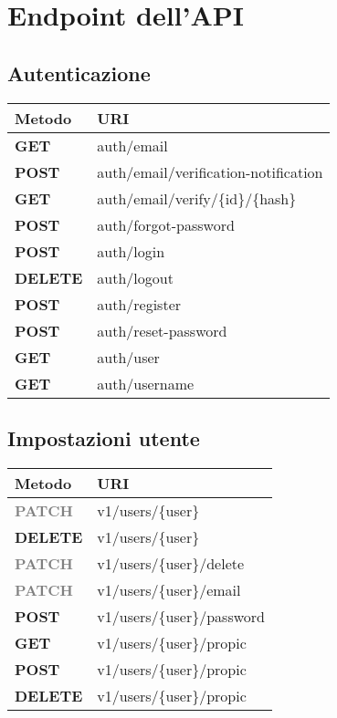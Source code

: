 \chapter{Endpoint dell'API}\label{cap:endpoint_api}
\section{Autenticazione}
\begin{table}[h]
	\begin{tabularx}{\textwidth}{l X}
		\hline
		\textbf{Metodo} & \textbf{URI} \\
		\hline
		\textcolor{get}{\textbf{GET}}    &     auth/email  \\
		\textcolor{post}{\textbf{POST}} &           auth/email/verification-notification  \\
		\textcolor{get}{\textbf{GET}}     &   auth/email/verify/\{id\}/\{hash\}   \\
		\textcolor{post}{\textbf{POST}}     &       auth/forgot-password   \\
		\textcolor{post}{\textbf{POST}}      &      auth/login  \\
		\textcolor{delete}{\textbf{DELETE}} &          auth/logout \\
		\textcolor{post}{\textbf{POST}}    &        auth/register  \\
		\textcolor{post}{\textbf{POST}}   &         auth/reset-password   \\
		\textcolor{get}{\textbf{GET}}      &   auth/user   \\
		\textcolor{get}{\textbf{GET}}     &    auth/username  \\
		\hline
	\end{tabularx}
\end{table}

\section{Impostazioni utente}
\begin{table}[h]
	\begin{tabularx}{\textwidth}{l X}
		\hline
		\textbf{Metodo} & \textbf{URI} \\
		\hline
		\textcolor{gray}{\textbf{PATCH}}    &        v1/users/\{user\}\\
		\textcolor{delete}{\textbf{DELETE}}  &        v1/users/\{user\}\\
		\textcolor{gray}{\textbf{PATCH}}     &      v1/users/\{user\}/delete\\
		\textcolor{gray}{\textbf{PATCH}}    &      v1/users/\{user\}/email\\
		\textcolor{post}{\textbf{POST}}    &       v1/users/\{user\}/password\\
		\textcolor{get}{\textbf{GET}} &       v1/users/\{user\}/propic\\
		\textcolor{post}{\textbf{POST}}      &     v1/users/\{user\}/propic\\
		\textcolor{delete}{\textbf{DELETE}}    &     v1/users/\{user\}/propic\\
		\hline
	\end{tabularx}
\end{table}


